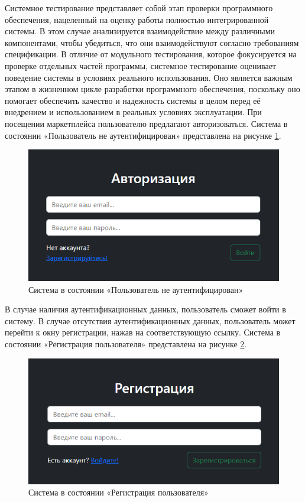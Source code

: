 \newpage %
Системное тестирование представляет собой этап проверки программного обеспечения, нацеленный на оценку работы полностью интегрированной системы. В этом случае анализируется взаимодействие между различными компонентами, чтобы убедиться, что они взаимодействуют согласно требованиям спецификации. В отличие от модульного тестирования, которое фокусируется на проверке отдельных частей программы, системное тестирование оценивает поведение системы в условиях реального использования. Оно является важным этапом в жизненном цикле разработки программного обеспечения, поскольку оно помогает обеспечить качество и надежность системы в целом перед её внедрением и использованием в реальных условиях эксплуатации. При посещении маркетплейса пользователю предлагают авторизоваться. Система в состоянии «Пользователь не аутентифицирован» представлена на рисунке \ref{fig:logweb}.

\begin{figure}[ht]
	\centering
	\includegraphics[width=0.7\linewidth]{images/log_web}
	\caption{Система в состоянии «Пользователь не аутентифицирован»}
	\label{fig:logweb}
\end{figure}

В случае наличия аутентификационных данных, пользователь сможет войти в систему. В случае отсутствия аутентификационных данных, пользователь может перейти к окну регистрации, нажав на соответствующую ссылку. Система в состоянии «Регистрация пользователя» представлена на рисунке \ref{fig:regweb}.

\begin{figure}[ht]
	\centering
	\includegraphics[width=0.7\linewidth]{images/reg_web}
	\caption{Система в состоянии «Регистрация пользователя»}
	\label{fig:regweb}
\end{figure}

